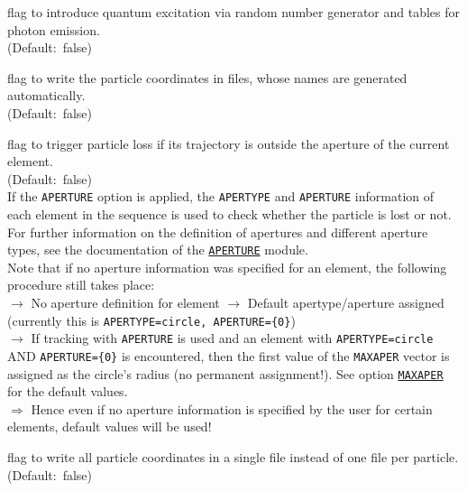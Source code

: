 \begin{madlist}
   flag to introduce quantum excitation via random
  number generator and tables for photon emission. \\ (Default:~false)

   flag to write the particle coordinates in files, whose
  names are generated automatically. \\ (Default:~false)

   flag to trigger particle loss if its trajectory is
  outside the aperture of the current element. \\ 
  (Default:~false) \\
  If the {\tt APERTURE} option is applied, the {\tt APERTYPE} 
  and {\tt APERTURE} information of each element in the sequence
  is used to check whether the particle is lost or not. For further
  information on the definition of apertures and different aperture
  types, see the documentation of the
  \hyperref[chap:aperture]{\tt APERTURE} module. \\  
  Note that if no aperture information was specified for an element, 
  the following procedure still takes place:
  \\
  $\rightarrow$ No aperture definition for element $\rightarrow$ 
  Default apertype/aperture assigned (currently this is   
  {\tt APERTYPE=circle, APERTURE=\{0\}}) 
  \\ $\rightarrow$  
  If tracking with {\tt APERTURE} is used and an
  element with {\tt APERTYPE=circle} AND {\tt APERTURE=\{0\}}  
  is encountered, then the first value of the {\tt MAXAPER} vector
  is assigned as the circle's radius (no permanent assignment!). 
  See option \hyperref[sec:run]{\tt MAXAPER} for the default values. 
  \\ $\Rightarrow$
  Hence even if no aperture information is specified by the user for
  certain elements, default values will be used! 


   flag to write all particle coordinates in a single
  file instead of one file per particle. \\ (Default:~false)


\end{madlist}
